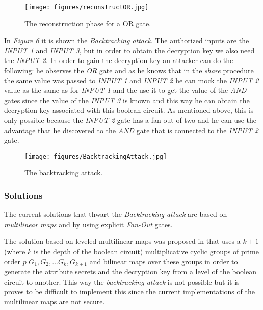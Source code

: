 \documentclass[12pt]{article}
\begin{document}
\begin{center}
	\begin{figure}[htpb]
\centering
\texttt{[image: figures/reconstructOR.jpg]}
\caption{
    The reconstruction phase for a OR gate.
}
\end{figure}
\end{center}

In \textit{Figure 6} it is shown the \textit{Backtracking attack}. The authorized inputs are the \textit{INPUT 1} and \textit{INPUT 3}, but in order to obtain the decryption key we also need the \textit{INPUT 2}. In order to gain the decryption key an attacker can do the following: he observes the \textit{OR} gate and as he knows that in the \textit{share} procedure the same value was passed to \textit{INPUT 1} and \textit{INPUT 2} he can mock the \textit{INPUT 2} value as the same as for \textit{INPUT 1} and the use it to get the value of the \textit{AND} gates since the value of the \textit{INPUT 3} is known and this way he can obtain the decryption key associated with this boolean circuit. As mentioned above, this is only possible because the \textit{INPUT 2} gate has a fan-out of two and he can use the advantage that he discovered to the \textit{AND} gate that is connected to the \textit{INPUT 2} gate.

\begin{center}
	\begin{figure}[htpb]
\centering
\texttt{[image: figures/BacktrackingAttack.jpg]}
\caption{
    The backtracking attack. \cite{gghsw}
}
\end{figure}
\end{center}

\subsubsection{Solutions}

The current solutions that thwart the \textit{Backtracking attack} are based on \textit{multilinear maps} and by using explicit \textit{Fan-Out} gates. 

The solution based on leveled multilinear maps was proposed in \cite{gghsw} that uses a $k + 1$(where $k$ is the depth of the boolean circuit) multiplicative cyclic groups of prime order $p$ $G_1, G_2, ... G_k, G_{k+1}$ and bilinear maps over these groups in order to generate the attribute secrets and the decryption key from a level of the boolean circuit to another. This way the \textit{backtracking attack} is not possible but it is proves to be difficult to implement this since the current implementations of the multilinear maps are not secure. 
\end{document}
